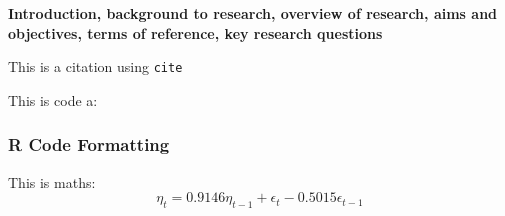 \textbf{Introduction, background to research, overview of research, aims and objectives, terms of reference, key research questions}

This is a citation \cite{Tibshirani_1996} using \texttt{cite}

This is code a:
\subsubsection{R Code Formatting}


This is maths:
\begin{equation}
\eta_t = 0.9146\eta_{t-1} + \epsilon_t -0.5015\epsilon_{t-1}
\end{equation}

